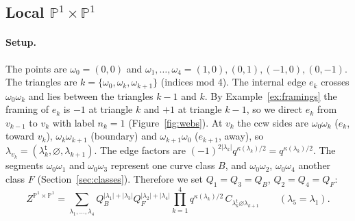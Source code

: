 \documentclass[11pt]{article}
\theoremstyle{plain}
\theoremstyle{definition}
\theoremstyle{remark}
\newcommand{\PP}{\mathbb{P}}
\newcommand{\es}{\varnothing}
\newcommand{\tr}{{\mathsf t}}
\newcommand{\lt}[1]{#1^{\tr}}
\begin{document}
\subsection{Local \texorpdfstring{$\PP^1\times\PP^1$}{P1xP1}}\label{ssec:F0}

\paragraph{Setup.} The points are $\omega_0=(0,0)$ and
$\omega_1,\ldots,\omega_4=(1,0),(0,1),(-1,0),(0,-1)$. The triangles are
$k=\{\omega_0,\omega_k,\omega_{k+1}\}$ (indices mod 4). The internal edge $e_k$ crosses
$\omega_0\omega_k$ and lies between the triangles $k-1$ and $k$. By Example~\ref{ex:framings} the framing of
$e_k$ is $-1$ at triangle $k$ and $+1$ at triangle $k-1$, so we direct $e_k$ from $v_{k-1}$ to
$v_k$ with label $n_k=1$ (Figure~\ref{fig:webs}). At $v_k$ the ccw sides are
$\omega_0\omega_k$ ($e_k$, toward $v_k$), $\omega_k\omega_{k+1}$ (boundary) and
$\omega_{k+1}\omega_0$ ($e_{k+1}$, away), so $\lambda_{v_k}=(\lt\lambda_k,\es,\lambda_{k+1})$. The edge
factors are $(-1)^{2|\lambda_k|}q^{\kappa(\lambda_k)/2}=q^{\kappa(\lambda_k)/2}$. The segments
$\omega_0\omega_1$ and $\omega_0\omega_3$ represent one curve class $B$, and $\omega_0\omega_2$,
$\omega_0\omega_4$ another class $F$ (Section~\ref{sec:classes}). Therefore we set
$Q_1=Q_3=Q_B$, $Q_2=Q_4=Q_F$:
\begin{equation}
Z^{\PP^1\times\PP^1}=\sum_{\lambda_1,\ldots,\lambda_4}Q_B^{|\lambda_1|+|\lambda_3|}Q_F^{|\lambda_2|+|\lambda_4|}
\prod_{k=1}^4q^{\kappa(\lambda_k)/2}\,C_{\lt\lambda_k\es\lambda_{k+1}}\qquad(\lambda_5=\lambda_1).
\end{equation}
\end{document}
